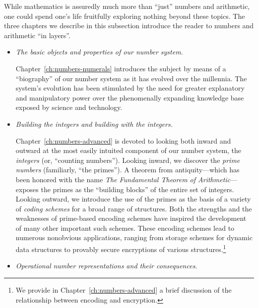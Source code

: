 While mathematics is assuredly much more than ``just'' numbers and arithmetic, one could spend one's life fruitfully exploring nothing beyond these topics.  The three chapters we describe in this
subsection introduce the reader to numbers and arithmetic ``in layers''.
\begin{itemize}
\item
{\em The basic objects and properties of our number system.}

\smallskip

Chapter~\ref{ch:numbers-numerals} introduces the subject by means of a ``biography'' of our number system as it has evolved over the millennia.  The system's evolution has been stimulated by the need for greater explanatory and manipulatory power over the phenomenally expanding knowledge base exposed by science and technology.

\medskip\item
{\em Building the integers and building with the integers.}

\smallskip

Chapter~\ref{ch:numbers-advanced} is devoted to looking both inward and outward at the most easily intuited component of our number system, the {\em integers} (or, ``counting numbers'').  Looking inward, we discover the {\em prime numbers} (familiarly, ``the primes'').  A theorem from antiquity---which has been honored with the name {\em The Fundamental Theorem of Arithmetic}---exposes the primes as the ``building blocks'' of the entire set of integers.  Looking outward, we introduce the use of the primes as the basis of a variety of {\em coding schemes} for a broad range of structures.  Both the strengths and the weaknesses of prime-based encoding schemes have inspired the development of many other important such schemes.  These encoding schemes lead to numerous nonobvious applications, ranging from storage schemes for dynamic data structures to provably secure encryptions of various structures.\footnote{We provide in Chapter~\ref{ch:numbers-advanced} a brief discussion of the relationship between encoding and encryption.}

\medskip\item
{\em Operational number representations and their consequences.}

\smallskip


\end{itemize}
